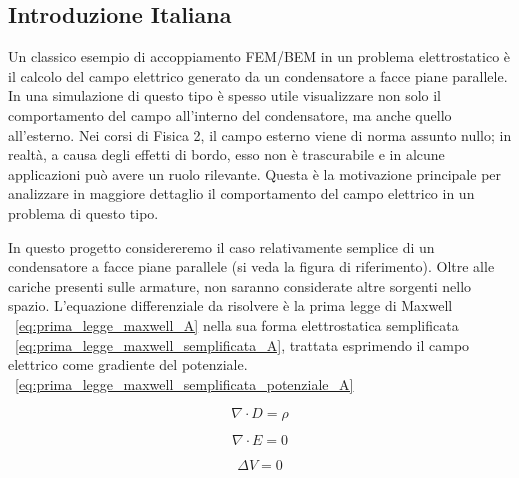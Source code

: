 \documentclass[11pt,onecolumn]{article}
\begin{document}
\newpage

\newpage

\begin{appendices}
\section{Introduzione Italiana}

Un classico esempio di accoppiamento FEM/BEM in un problema elettrostatico è il calcolo del campo elettrico generato da un condensatore a facce piane parallele. In una simulazione di questo tipo è spesso utile visualizzare non solo il comportamento del campo all’interno del condensatore, ma anche quello all’esterno. Nei corsi di Fisica 2, il campo esterno viene di norma assunto nullo; in realtà, a causa degli effetti di bordo, esso non è trascurabile e in alcune applicazioni può avere un ruolo rilevante. Questa è la motivazione principale per analizzare in maggiore dettaglio il comportamento del campo elettrico in un problema di questo tipo.

In questo progetto considereremo il caso relativamente semplice di un condensatore a facce piane parallele (si veda la figura di riferimento). Oltre alle cariche presenti sulle armature, non saranno considerate altre sorgenti nello spazio. L’equazione differenziale da risolvere è la prima legge di Maxwell ~\eqref{eq:prima_legge_maxwell_A} nella sua forma elettrostatica semplificata ~\eqref{eq:prima_legge_maxwell_semplificata_A}, trattata esprimendo il campo elettrico come gradiente del potenziale. ~\eqref{eq:prima_legge_maxwell_semplificata_potenziale_A}

\begin{equation}
	\nabla \cdot D = \rho
\label{eq:prima_legge_maxwell_A}
\end{equation}

\begin{equation}
	\nabla \cdot E = 0
\label{eq:prima_legge_maxwell_semplificata_A}
\end{equation}

\begin{equation}
	\Delta V = 0
\label{eq:prima_legge_maxwell_semplificata_potenziale_A}
\end{equation}


\end{appendices}
\end{document}
